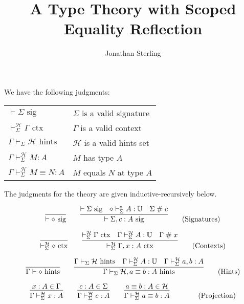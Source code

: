 \documentclass{amsart}
\title{A Type Theory with Scoped Equality Reflection}
\author{Jonathan Sterling}
\begin{document}
\maketitle

\def\emp{\diamond}
\def\sig{\mbox{ sig}}
\def\ctx{\mbox{ ctx}}
\def\hints{\mbox{ hints}}
\def\fresh{\mathrel{\#}}

\noindent
We have the following judgments:

\bigskip
\begin{tabular}{ll}
$\vdash\Sigma\sig$                            & $\Sigma$ is a valid signature\\
$\vdash_\Sigma^\mathcal{H}\Gamma\ctx$         & $\Gamma$ is a valid context\\
$\Gamma\vdash_\Sigma\mathcal{H}\hints$        & $\mathcal{H}$ is a valid hints set\\
$\Gamma\vdash_\Sigma^\mathcal{H} M:A$         & $M$ has type $A$\\
$\Gamma\vdash_\Sigma^\mathcal{H} M\equiv N:A$ & $M$ equals $N$ at type $A$
\end{tabular}
\bigskip

\noindent
The judgments for the theory are given inductive-recursively below.

\begin{equation}
  \infer{\vdash\emp\sig}{}
  \qquad
  \infer{
    \vdash\Sigma,c:A\sig
  }{
    \vdash\Sigma\sig &
    \emp\vdash_\Sigma^\emp A:\mathbb{U} &
    \Sigma\fresh c
  }
  \tag{Signatures}
\end{equation}

\begin{equation}
  \infer{\vdash_\Sigma^\mathcal{H}\emp\ctx}{}
  \qquad
  \infer{
    \vdash_\Sigma^\mathcal{H}\Gamma,x:A\ctx
  }{
    \vdash_\Sigma^\mathcal{H}\Gamma\ctx &
    \Gamma\vdash_\Sigma^\mathcal{H} A:\mathbb{U} &
    \Gamma\fresh x
  }
  \tag{Contexts}
\end{equation}

\begin{equation}
  \infer{\Gamma\vdash \emp\hints}{}
  \qquad
  \infer{
    \Gamma\vdash_\Sigma \mathcal{H}, a\equiv b:A\hints
  }{
    \Gamma\vdash_\Sigma \mathcal{H}\hints &
    \Gamma\vdash_\Sigma^\mathcal{H} A: \mathbb{U} &
    \Gamma\vdash_\Sigma^\mathcal{H} a,b : A
  }
  \tag{Hints}
\end{equation}

\begin{equation}
  \infer{
    \Gamma\vdash_\Sigma^\mathcal{H} x:A
  }{
    x:A\in\Gamma
  }
  \qquad
  \infer{
    \Gamma\vdash_\Sigma^\mathcal{H} c:A
  }{
    c:A\in\Sigma
  }
  \qquad
  \infer{
    \Gamma\vdash_\Sigma^\mathcal{H} a\equiv b:A
  }{
    a\equiv b:A \in \mathcal{H}
  }
  \qquad
  \tag{Projection}
\end{equation}
\end{document}
